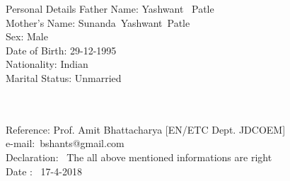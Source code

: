 \documentclass[10pt]{article}
\begin{document}
\begin{flushleft}
    \indent  Personal Details \hspace{0.3in} Father Name:\hspace{0.25in} Yashwant \  Patle \\							
    \hspace{1.37in}Mother's Name: \hspace{0.07in} Sunanda\ Yashwant\ Patle  \\
    \hspace{1.33in} Sex: \hspace{0.8in}  Male\\
    \hspace{1.33in}	Date of Birth:\hspace{0.25in} 29-12-1995\\
    \hspace{1.33in} Nationality: \hspace{0.34in} Indian\\
    \hspace{1.32in} Marital Status:\hspace{0.2in} Unmarried
    
    \indent\\
    \indent\\
	\indent Reference\hspace{0.72in}: Prof. Amit Bhattacharya [EN/ETC Dept. JDCOEM]\\ \hspace{1.5in}e-mail:\ bshants@gmail.com\\
	\indent Declaration\hspace{0.6in}: \ The all above mentioned informations are right\\
	\indent Date \hspace{0.97in}: \ 17-4-2018\\

	\end{flushleft}
\end{document}
